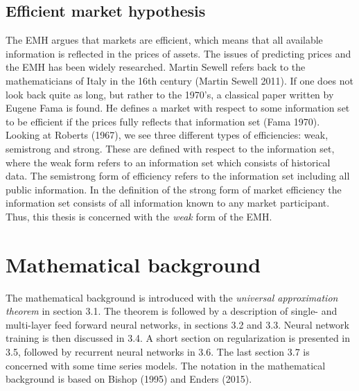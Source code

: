 \documentclass[12pt, letterpaper]{amsart}%
\begin{document}
\subsection{Efficient market hypothesis}
The EMH argues that markets are efficient, which means that all available information is reflected in the prices of assets. The issues of predicting prices and the EMH has been widely researched. Martin Sewell refers back to the mathematicians of Italy in the 16th century (Martin Sewell 2011). If one does not look back quite as long, but rather to the 1970's, a classical paper written by Eugene Fama is found. He defines a market with respect to some information set to be efficient if the prices fully reflects that information set (Fama 1970).
\\

Looking at Roberts (1967), we see three different types of efficiencies: weak, semistrong and strong. These are defined with respect to the information set, where the weak form refers to an information set which consists of historical data. The semistrong form of efficiency refers to the information set including all public information. In the definition of the strong form of market efficiency the information set consists of all information known to any market participant. Thus, this thesis is concerned with the \textit{weak} form of the EMH.

\section{Mathematical background}
The mathematical background is introduced with the \textit{universal approximation theorem} in section 3.1. The theorem is followed by a description of single- and multi-layer feed forward neural networks, in sections 3.2 and 3.3. Neural network training is then discussed in 3.4. A short section on regularization is presented in 3.5, followed by recurrent neural networks in 3.6. The last section 3.7 is concerned with some time series models. The notation in the mathematical background is based on Bishop (1995) and Enders (2015).
\end{document}
